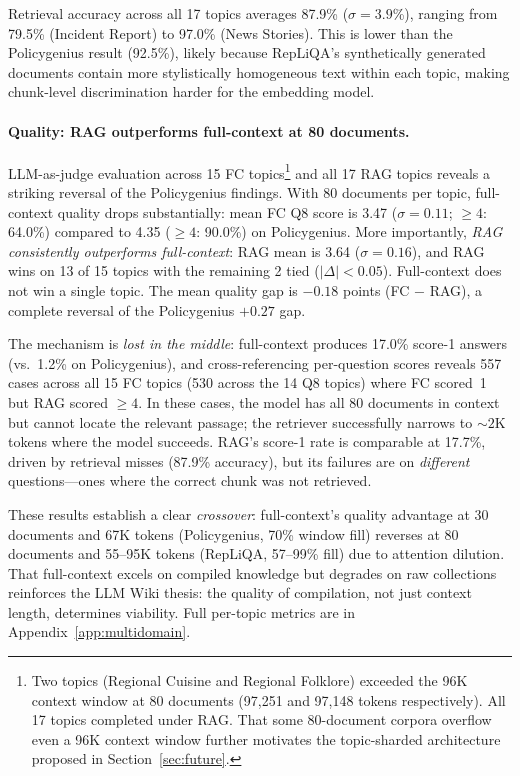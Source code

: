 \documentclass{article}
\begin{document}
Retrieval accuracy across all 17 topics averages 87.9\%
($\sigma=3.9$\%), ranging from 79.5\% (Incident Report) to
97.0\% (News Stories). This is lower than the Policygenius
result (92.5\%), likely because RepLiQA's synthetically generated documents
contain more stylistically homogeneous text within each topic, making
chunk-level discrimination harder for the embedding model.

\paragraph{Quality: RAG outperforms full-context at 80 documents.}
LLM-as-judge evaluation across 15 FC topics\footnote{Two topics
(Regional Cuisine and Regional Folklore) exceeded the 96K
context window at 80 documents (97,251 and 97,148 tokens respectively).
All 17 topics completed under RAG.
That some 80-document corpora overflow even a 96K context window further
motivates the topic-sharded architecture proposed in
Section~\ref{sec:future}.} and all 17 RAG topics
reveals a striking reversal of the Policygenius findings. With 80
documents per topic, full-context quality drops substantially: mean
FC Q8 score is 3.47 ($\sigma=0.11$; $\geq\!4$: 64.0\%) compared to
4.35 ($\geq\!4$: 90.0\%) on Policygenius. More importantly,
\emph{RAG consistently outperforms full-context}: RAG mean is 3.64
($\sigma=0.16$), and RAG wins on 13 of 15 topics with the remaining 2
tied ($|\Delta| < 0.05$). Full-context does not win a single topic.
The mean quality gap is $-0.18$ points (FC $-$ RAG), a complete
reversal of the Policygenius $+0.27$ gap.

The mechanism is \emph{lost in the middle}: full-context produces 17.0\%
score-1 answers (vs.\ 1.2\% on Policygenius), and cross-referencing
per-question scores reveals 557 cases across all 15 FC topics
(530 across the 14 Q8 topics) where FC scored~1
but RAG scored $\geq\!4$. In these cases, the model has all 80 documents
in context but cannot locate the relevant passage; the retriever
successfully narrows to ${\sim}2$K tokens where the model succeeds.
RAG's score-1 rate is comparable at 17.7\%, driven by retrieval
misses (87.9\% accuracy), but its failures are on \emph{different}
questions---ones where the correct chunk was not retrieved.

These results establish a clear \emph{crossover}: full-context's quality
advantage at 30 documents and 67K tokens (Policygenius, 70\% window fill)
reverses at 80 documents and 55--95K tokens (RepLiQA, 57--99\% fill)
due to attention dilution.
That full-context excels on compiled knowledge but degrades on raw
collections reinforces the LLM Wiki thesis: the quality of compilation,
not just context length, determines viability.
Full per-topic metrics are in Appendix~\ref{app:multidomain}.
\end{document}
